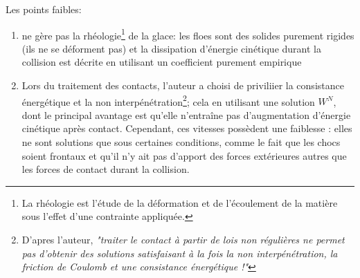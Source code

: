 \documentclass[
  french,
	11pt, %
]{fphw}
\begin{document}
Les points faibles:
\begin{enumerate}
  \item ne gère pas la rhéologie\footnote{La rhéologie est l'étude de la déformation et de l'écoulement de la matière sous l'effet d'une contrainte appliquée.} de la glace: les floes sont des solides purement rigides (ils ne se déforment pas) et la dissipation d’énergie cinétique durant la collision est décrite en utilisant un coefficient purement empirique
  \item Lors du traitement des contacts, l'auteur a choisi de priviliier la consistance énergétique et la non interpénétration\footnote{D'apres l'auteur, \textit{"traiter le contact à partir de lois non régulières ne permet pas d’obtenir des solutions satisfaisant à la fois la non interpénétration, la friction de Coulomb et une consistance énergétique !"}}; cela en utilisant une solution $W^N$, dont le principal avantage est qu’elle n’entraîne pas d’augmentation d’énergie cinétique après contact. Cependant, ces vitesses possèdent une faiblesse : elles ne sont solutions que sous certaines conditions, comme le fait que les chocs soient frontaux et qu’il n’y ait pas d’apport des forces extérieures autres que les forces de contact durant la
  collision.  
\end{enumerate}






\end{document}
